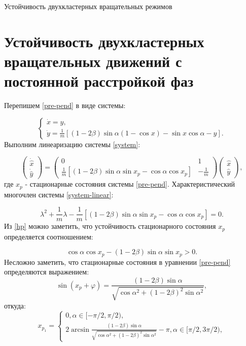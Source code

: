 \begin{chapter}{Устойчивость двухкластерных вращательных режимов}
	\section{Устойчивость двухкластерных вращательных движений с постоянной расстройкой фаз}
	
	Перепишем \eqref{pre-pend} в виде системы:
	
	\begin{equation} \label{system}
		\begin{cases}
			\dot{x} = y, \\
			\dot{y} = \frac{1}{m} \left[ (1 - 2\beta)\sin{\alpha}(1 - \cos{x}) - \sin{x}\cos{\alpha} - y \right].
		\end{cases}
	\end{equation}
	Выполним линеаризацию системы \eqref{system}:
	
	\begin{equation} \label{system-linear}
		\begin{pmatrix}
			\dot{\hat{x}} \\
			\dot{\hat{y}}
		\end{pmatrix}
		=
		\begin{pmatrix}
			0 & 1 \\
			\frac{1}{m}\left[ (1 - 2\beta)\sin{\alpha}\sin{x_p} - \cos{\alpha}\cos{x_p} \right] & -\frac{1}{m}
		\end{pmatrix}
		\begin{pmatrix}
			\hat{x} \\
			\hat{y}
		\end{pmatrix},
	\end{equation}
	где $x_p$ - стационарные состояния системы \eqref{pre-pend}. Характеристический многочлен системы \eqref{system-linear}:
	
	\begin{equation} \label{hp}
		\lambda^2 + \frac{1}{m}\lambda - \frac{1}{m}\left[ (1 - 2\beta)\sin{\alpha}\sin{x_p} - \cos{\alpha}\cos{x_p} \right] = 0.
	\end{equation}
	Из \eqref{hp} можно заметить, что устойчивость стационарного состояния $x_p$ определяется соотношением:
	
	\begin{equation} \label{hp-stability}
		\cos{\alpha}\cos{x_p} - (1 - 2\beta)\sin{\alpha}\sin{x_p} > 0.
	\end{equation}
	Несложно заметить, что стационарные состояния в уравнении \eqref{pre-pend} определяются выражением:
	$$
	\sin{(x_p + \varphi)} = \frac{(1 - 2\beta) \sin{\alpha}}{\sqrt{\cos{\alpha}^2 + (1 - 2\beta)^2\sin{\alpha}^2}},
	$$
	откуда:
	\begin{equation} \label{x1}
		x_{p_1} = \begin{cases}
			0, \alpha \in [-\pi/2, \pi/2), \\
			2\arcsin{\frac{(1 - 2\beta) \sin{\alpha}}{\sqrt{\cos{\alpha}^2 + (1 - 2\beta)^2\sin{\alpha}^2}}} - \pi , \alpha \in [\pi/2, 3\pi/2),
		\end{cases}
	\end{equation}
	

\end{chapter}
